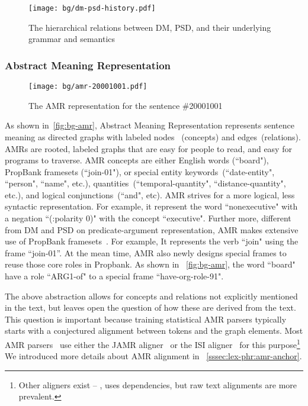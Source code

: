 \begin{figure}[!th]
  \centering
  \texttt{[image: bg/dm-psd-history.pdf]}
\caption{\label{fig:dm-psd-history}The hierarchical relations between
  DM, PSD, and their underlying grammar and semantics}
\end{figure}


\subsubsection{Abstract Meaning Representation}
\label{ssec:bg:amr}
%
\begin{figure}[!th]
\centering
\texttt{[image: bg/amr-20001001.pdf]}
\caption{\label{fig:bg-amr} The AMR representation for the sentence
  \#20001001}
\end{figure}

As shown in~\autoref{fig:bg-amr}, Abstract Meaning Representation
represents sentence meaning as directed graphs with labeled nodes
~(concepts) and edges~(relations). AMRs are rooted, labeled graphs
that are easy for people to read, and easy for programs to traverse.
AMR concepts are either English words (``board"), PropBank framesets
(``join-01"), or special entity keywords~(``date-entity", ``person",
``name", etc.), quantities~(``temporal-quantity",
``distance-quantity", etc.), and logical conjunctions~(``and", etc).
AMR strives for a more logical, less syntactic representation.  For
example, it represent the word ``nonexecutive" with a negation
``(:polarity 0)" with the concept ``executive". Further more,
different from DM and PSD on predicate-argument representation, AMR
makes extensive use of PropBank framesets~\citep{Kin:Pal:02,
  palmer2005proposition}. For example, It represents the verb ``join"
using the frame “join-01”. At the mean time, AMR also newly designs
special frames to reuse those core roles in Propbank. As shown in
~\autoref{fig:bg-amr}, the word ``board" have a role ``ARG1-of" to a
special frame ``have-org-role-91".

The above abstraction allows for concepts and relations not explicitly
mentioned in the text, but leaves open the question of how these are
derived from the text. This question is important because training
statistical AMR parsers typically starts with a conjectured alignment
between tokens and the graph elements. Most AMR
parsers~\cite[\eg][]{Flanigan:2014vc,Wang:2015uo,Artzi:2009tb,Pust:2015ug,Peng:2015tj,Konstas:2017uj,Wang:2017vt}
use either the JAMR aligner~\cite{Flanigan:2014vc} or the ISI
aligner~\cite{Pourdamghani:2014aligning} for this
purpose\footnote{Other aligners exist -- \eg,
  \citet{chen2017unsupervised} uses dependencies, but raw text
  alignments are more prevalent.}  We introduced more details about
AMR alignment in ~\autoref{sssec:lex-phr:amr-anchor}.


